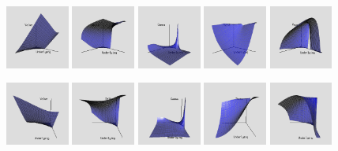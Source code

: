 \documentclass[compress]{beamer}
\begin{document}
\begin{frame}
  \includegraphics[width=0.82in]{figures/animation/Value04}
  \includegraphics[width=0.82in]{figures/animation/Delta04}
  \includegraphics[width=0.82in]{figures/animation/Gamma04}
  \includegraphics[width=0.82in]{figures/animation/Theta04}
  \includegraphics[width=0.82in]{figures/animation/Vega04}

  \includegraphics[width=0.82in]{figures/animation/Value07}
  \includegraphics[width=0.82in]{figures/animation/Delta07}
  \includegraphics[width=0.82in]{figures/animation/Gamma07}
  \includegraphics[width=0.82in]{figures/animation/Theta07}
  \includegraphics[width=0.82in]{figures/animation/Vega07}

\end{frame}
\end{document}
